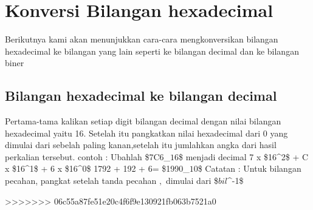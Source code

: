 \section{Konversi Bilangan hexadecimal}
Berikutnya kami akan menunjukkan cara-cara mengkonversikan bilangan hexadecimal ke bilangan yang lain seperti ke bilangan decimal dan ke bilangan biner
\subsection{Bilangan hexadecimal ke bilangan decimal}
Pertama-tama kalikan setiap digit bilangan decimal dengan nilai bilangan hexadecimal yaitu 16. Setelah itu pangkatkan nilai hexadecimal dari 0 yang dimulai dari sebelah paling kanan,setelah itu jumlahkan angka dari hasil perkalian tersebut.
contoh : 
Ubahlah \$7C6_\(16\)\$ menjadi decimal
		7 x \$16^2\$ + C x \$16^1\$ + 6 x \$16^0\$
		1792 + 192 + 6= \$1990_\(10\)\$
Catatan : Untuk bilangan pecahan, pangkat setelah tanda pecahan \(,\) dimulai dari \$\(bil\)^-1\$

>>>>>>> 06c55a87fe51e20c4f6f9e130921fb063b7521a0
